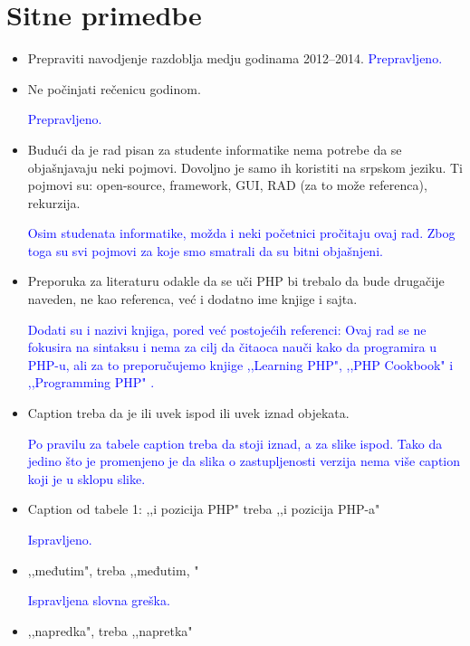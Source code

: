 \documentclass[a4paper]{report}
\newcommand{\odgovor}[1]{\textcolor{blue}{#1}}
\begin{document}
\section{Sitne primedbe}
\begin{itemize}
\item Prepraviti navodjenje razdoblja medju godinama 2012--2014.
\odgovor{Prepravljeno.}

\item Ne počinjati rečenicu godinom.

\odgovor{Prepravljeno.}

\item Budući da je rad pisan za studente informatike nema potrebe da se objašnjavaju neki pojmovi. Dovoljno je samo ih koristiti na srpskom jeziku. Ti pojmovi su: open-source, framework, GUI, RAD (za to može referenca), rekurzija.

\odgovor{Osim studenata informatike, možda i neki početnici pročitaju ovaj rad. Zbog toga su svi pojmovi za koje smo smatrali da su bitni objašnjeni.}

\item Preporuka za literaturu odakle da se uči PHP bi trebalo da bude drugačije naveden, ne kao referenca, već i dodatno ime knjige i sajta.

\odgovor{Dodati su i nazivi knjiga, pored već postojećih referenci: Ovaj rad se ne fokusira na sintaksu i nema za cilj da čitaoca nauči kako da programira u PHP-u, ali za to preporučujemo knjige ,,Learning PHP", ,,PHP Cookbook" i ,,Programming PHP" \cite{learningPHP, PHPCookbook, programmingPHP}.}

\item Caption treba da je ili uvek ispod ili uvek iznad objekata.

\odgovor{Po pravilu za tabele caption treba da stoji iznad, a za slike ispod. Tako da jedino što je promenjeno je da slika o zastupljenosti verzija nema više caption koji je u sklopu slike.}

\item Caption od tabele 1: ,,i pozicija PHP" treba ,,i pozicija PHP-a"

\odgovor{Ispravljeno.}

\item ,,međutim", treba ,,međutim, "

\odgovor{Ispravljena slovna greška.}
 
\item ,,napredka", treba ,,napretka"


\end{itemize}
\end{document}

